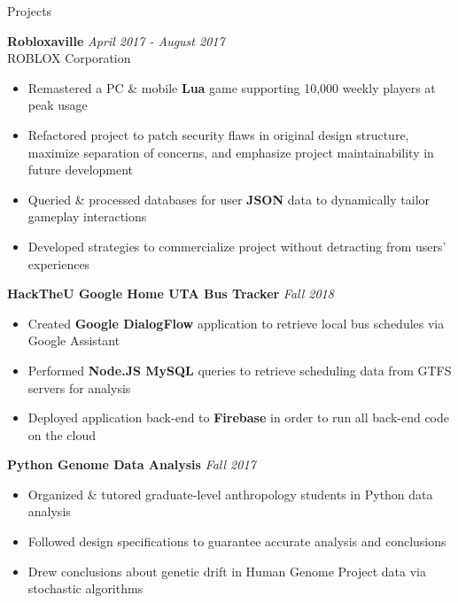 \documentclass{resume} %
\begin{document}
\begin{rSection}{Projects}

{\bf Robloxaville} \hfill {\em April 2017 - August 2017}
\\ ROBLOX Corporation
\vspace{-6pt}
\begin{itemize}[nosep]
  \item Remastered a PC \& mobile {\bf Lua} game supporting 10,000 weekly players at peak usage
  \item Refactored project to patch security flaws in original design structure, maximize separation of concerns, and emphasize project maintainability in future development
  \item Queried \& processed databases for user {\bf JSON} data to dynamically tailor gameplay interactions
  \item Developed strategies to commercialize project without detracting from users' experiences
\end{itemize}

{\bf HackTheU Google Home UTA Bus Tracker} \hfill {\em Fall 2018}
\vspace{-6pt}
\begin{itemize}[nosep]
  \item Created {\bf Google DialogFlow} application to retrieve local bus schedules via Google Assistant
  \item Performed {\bf Node.JS MySQL} queries to retrieve scheduling data from GTFS servers for analysis
  \item Deployed application back-end to {\bf Firebase} in order to run all back-end code on the cloud
\end{itemize}

{\bf Python Genome Data Analysis} \hfill {\em Fall 2017}
\vspace{-6pt}
\begin{itemize}[nosep]
  \item Organized \& tutored graduate-level anthropology students in Python data analysis
  \item Followed design specifications to guarantee accurate analysis and conclusions
  \item Drew conclusions about genetic drift in Human Genome Project data via stochastic algorithms
\end{itemize}

\end{rSection}
\end{document}
